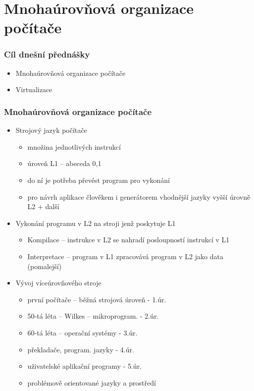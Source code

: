 \documentclass{beamer}
\subtitle{Lekce 13. Virtuální stroje a virtualizace}
\author{Pavel Píša \phantom{xxxxxxxxx} Petr Štěpán \\ \small\texttt{pisa@fel.cvut.cz}\phantom{xxxx}\small\texttt{stepan@fel.cvut.cz}}
\begin{document}
\maketitle

\section{Mnohaúrovňová organizace počítače}

\begin{frame}
\frametitle{Cíl dnešní přednášky}

\begin{itemize}
 \item Mnohaúrovňová organizace počítače
 \item Virtualizace
\end{itemize}
\end{frame}

\begin{frame}
\frametitle{Mnohaúrovňová organizace počítače}

\begin{itemize}
 \item Strojový jazyk počítače
 \begin{itemize}
  \item množina jednotlivých instrukcí
  \item úroveň L1 -- abeceda {0,1}
  \item do ní je potřeba převést program pro vykonání
  \item pro návrh aplikace člověkem i generátorem vhodnější jazyky vyšší úrovně L2 + další
 \end{itemize}
 \item Vykonání programu v L2 na stroji jenž poskytuje L1
 \begin{itemize}
  \item Kompilace -- instrukce v L2 se nahradí posloupností instrukcí v L1
  \item Interpretace -- program v L1 zpracovává program v L2 jako data (pomalejší)
 \end{itemize}
 \item Vývoj víceúrovňového stroje
 \begin{itemize}
  \item první počítače -- běžná strojová úroveň - 1.úr.
  \item 50-tá léta -- Wilkes -- mikroprogram. - 2.úr.
  \item 60-tá léta -- operační systémy - 3.úr.
  \item překladače, program. jazyky - 4.úr.
  \item uživatelské aplikační programy - 5.úr.
  \item problémově orientované jazyky a prostředí
 \end{itemize}
\end{itemize}

\end{frame}
\end{document}
